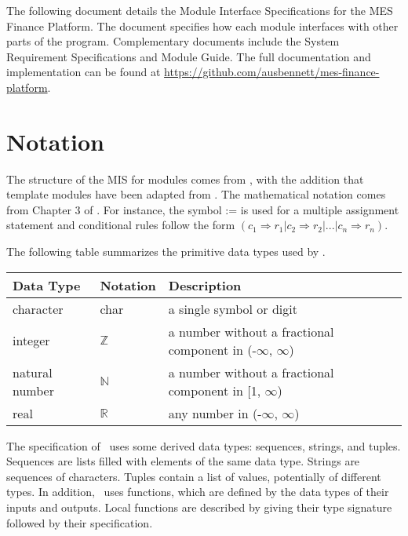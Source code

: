 \documentclass[12pt, titlepage]{article}
\begin{document}
The following document details the Module Interface Specifications for
the MES Finance Platform. The document specifies how each module interfaces with other parts of the program. Complementary documents include the System Requirement Specifications and Module Guide.  The full documentation and implementation can be found at \url{https://github.com/ausbennett/mes-finance-platform}.

\section{Notation}


The structure of the MIS for modules comes from \citet{HoffmanAndStrooper1995},
with the addition that template modules have been adapted from
\cite{GhezziEtAl2003}.  The mathematical notation comes from Chapter 3 of
\citet{HoffmanAndStrooper1995}.  For instance, the symbol := is used for a
multiple assignment statement and conditional rules follow the form $(c_1
\Rightarrow r_1 | c_2 \Rightarrow r_2 | ... | c_n \Rightarrow r_n )$.

The following table summarizes the primitive data types used by \progname. 

\begin{center}
\renewcommand{\arraystretch}{1.2}
\noindent 
\begin{tabular}{l l p{7.5cm}} 
\toprule 
\textbf{Data Type} & \textbf{Notation} & \textbf{Description}\\ 
\midrule
character & char & a single symbol or digit\\
integer & $\mathbb{Z}$ & a number without a fractional component in (-$\infty$, $\infty$) \\
natural number & $\mathbb{N}$ & a number without a fractional component in [1, $\infty$) \\
real & $\mathbb{R}$ & any number in (-$\infty$, $\infty$)\\
\bottomrule
\end{tabular} 
\end{center}

\noindent
The specification of \progname \ uses some derived data types: sequences, strings, and
tuples. Sequences are lists filled with elements of the same data type. Strings
are sequences of characters. Tuples contain a list of values, potentially of
different types. In addition, \progname \ uses functions, which
are defined by the data types of their inputs and outputs. Local functions are
described by giving their type signature followed by their specification.
\end{document}
